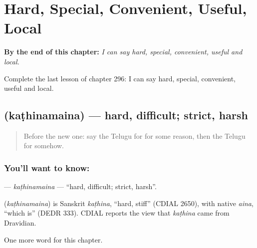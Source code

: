 
\chapter{Hard, Special, Convenient, Useful, Local}
\label{ch:te-hard-special-convenient-useful-local}

\begin{chapteropening}
\textbf{By the end of this chapter:} \emph{I can say hard, special, convenient, useful and local.}

Complete the last lesson of chapter 296: I can say hard, special, convenient, useful and local.
\end{chapteropening}

\section[\texorpdfstring{\te{కఠినమైన} (kaṭhinamaina)}{కఠినమైన (kaṭhinamaina)}]{ (kaṭhinamaina) — hard, difficult; strict, harsh}

\label{lesson:TE-C296-kathinamaina}



\begin{quote}
Before the new one: say the Telugu for for some reason, then the Telugu for somehow.
\end{quote}

\subsection*{You'll want to know: }
\textbf{} — \emph{kaṭhinamaina} — \textquotedblleft{}hard, difficult; strict, harsh\textquotedblright{}.

\begin{cousinweb}
\textbf{} (\emph{kaṭhinamaina}) is Sanskrit \emph{kaṭhina}, \textquotedblleft{}hard, stiff\textquotedblright{} (CDIAL 2650), with native \emph{aina}, \textquotedblleft{}which is\textquotedblright{} (DEDR 333). CDIAL reports the view that \emph{kaṭhina} came from Dravidian.
\end{cousinweb}

\begin{grammarlens}[title={What you've built}]
One more word for this chapter.
\end{grammarlens}

